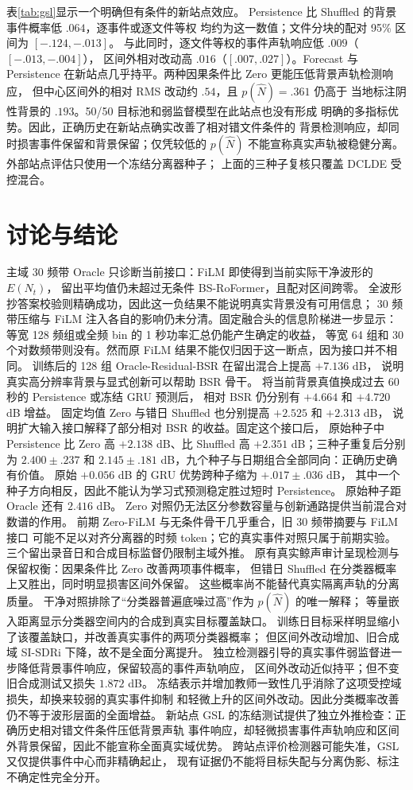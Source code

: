 \documentclass[conference]{IEEEtran}
\begin{document}
表\ref{tab:gsl}显示一个明确但有条件的新站点效应。
Persistence 比 Shuffled 的背景事件概率低 $.064$，逐事件或逐文件等权
均约为这一数值；文件分块的配对 95\% 区间为 $[-.124,-.013]$。
与此同时，逐文件等权的事件声轨响应低 $.009$（$[-.013,-.004]$），
区间外相对改动高 $.016$（$[.007,.027]$）。Forecast 与 Persistence
在新站点几乎持平。两种因果条件比 Zero 更能压低背景声轨检测响应，
但中心区间外的相对 RMS 改动约 $.54$，且 $p(\hat N)=.361$ 仍高于
当地标注阴性背景的 $.193$。50/50 目标池和弱监督模型在此站点也没有形成
明确的多指标优势。因此，正确历史在新站点确实改善了相对错文件条件的
背景检测响应，却同时损害事件保留和背景保留；仅凭较低的 $p(\hat N)$
不能宣称真实声轨被稳健分离。外部站点评估只使用一个冻结分离器种子；
上面的三种子复核只覆盖 DCLDE 受控混合。

\section{讨论与结论}
主域 30 频带 Oracle 只诊断当前接口：FiLM 即使得到当前实际干净波形的 $E(N_t)$，
留出平均值仍未超过无条件 BS-RoFormer，且配对区间跨零。
全波形抄答案校验则精确成功，因此这一负结果不能说明真实背景没有可用信息；
30 频带压缩与 FiLM 注入各自的影响仍未分清。固定融合头的信息阶梯进一步显示：
等宽 128 频组或全频 bin 的 1 秒功率汇总仍能产生确定的收益，
等宽 64 组和 30 个对数频带则没有。然而原 FiLM 结果不能仅归因于这一断点，因为接口并不相同。
训练后的 128 组 Oracle-Residual-BSR 在留出混合上提高 $+7.136$ dB，
说明真实高分辨率背景与显式创新可以帮助 BSR 骨干。
将当前背景真值换成过去 60 秒的 Persistence 或冻结 GRU 预测后，
相对 BSR 仍分别有 $+4.664$ 和 $+4.720$ dB 增益。
固定均值 Zero 与错日 Shuffled 也分别提高 $+2.525$ 和 $+2.313$ dB，
说明扩大输入接口解释了部分相对 BSR 的收益。固定这个接口后，
原始种子中 Persistence 比 Zero 高 $+2.138$ dB、比 Shuffled 高
$+2.351$ dB；三种子重复后分别为 $2.400\pm.237$ 和
$2.145\pm.181$ dB，九个种子与日期组合全部同向：正确历史确有价值。
原始 $+0.056$ dB 的 GRU 优势跨种子缩为 $+.017\pm.036$ dB，
其中一个种子方向相反，因此不能认为学习式预测稳定胜过短时 Persistence。
原始种子距 Oracle 还有 $2.416$ dB。
Zero 对照仍无法区分参数容量与创新通路提供当前混合对数谱的作用。
前期 Zero-FiLM 与无条件骨干几乎重合，旧 30 频带摘要与 FiLM 接口
可能不足以对齐分离器的时频 token；它的真实事件对照只属于前期实验。
三个留出录音日和合成目标监督仍限制主域外推。
原有真实鲸声审计呈现检测与保留权衡：因果条件比 Zero 改善两项事件概率，
但错日 Shuffled 在分类器概率上又胜出，同时明显损害区间外保留。
这些概率尚不能替代真实隔离声轨的分离质量。
干净对照排除了“分类器普遍底噪过高”作为 $p(\hat N)$ 的唯一解释；
等量嵌入距离显示分类器空间内的合成到真实目标覆盖缺口。
训练日目标采样明显缩小了该覆盖缺口，并改善真实事件的两项分类器概率；
但区间外改动增加、旧合成域 SI-SDRi 下降，故不是全面分离提升。
独立检测器引导的真实事件弱监督进一步降低背景事件响应，保留较高的事件声轨响应，
区间外改动近似持平；但不变旧合成测试又损失 $1.872$ dB。
冻结表示并增加教师一致性几乎消除了这项受控域损失，却换来较弱的真实事件抑制
和轻微上升的区间外改动。因此分类概率改善仍不等于波形层面的全面增益。
新站点 GSL 的冻结测试提供了独立外推检查：正确历史相对错文件条件压低背景声轨
事件响应，却轻微损害事件声轨响应和区间外背景保留，因此不能宣称全面真实域优势。
跨站点评价检测器可能失准，GSL 又仅提供事件中心而非精确起止，
现有证据仍不能将目标失配与分离伪影、标注不确定性完全分开。
\end{document}
